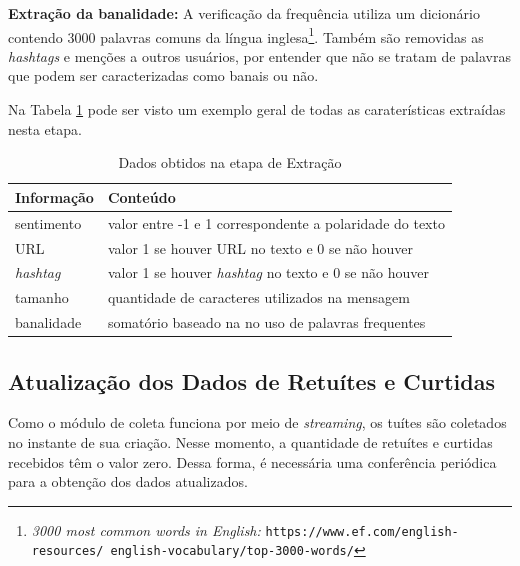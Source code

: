 \documentclass[oneside,openright,12pt]{ufsm_2015} %
\begin{document}
    \par \textbf{Extração da banalidade:} A verificação da frequência utiliza um dicionário contendo 3000 palavras comuns da língua inglesa\footnote{\textit{3000 most common words in English: }\texttt{https://www.ef.com/english-resources/ english-vocabulary/top-3000-words/}}. Também são removidas as \textit{hashtags} e menções a outros usuários, por entender que não se tratam de palavras que podem ser caracterizadas como banais ou não.
    
    \par Na Tabela \ref{tab:dados-extracao} pode ser visto um exemplo geral de todas as caraterísticas extraídas nesta etapa.

    \begin{table}[ht]
    \centering
    \caption{Dados obtidos na etapa de Extração}
    \label{tab:dados-extracao}
    \begin{tabular}{|l|l|}
    \hline
    \textbf{Informação} & \textbf{Conteúdo} \\ \hline
    sentimento & valor entre -1 e 1 correspondente a polaridade do texto \\ \hline
    URL & valor 1 se houver URL no texto e 0 se não houver \\ \hline
    \textit{hashtag} & valor 1 se houver \textit{hashtag} no texto e 0 se não houver \\ \hline
    tamanho & quantidade de caracteres utilizados na mensagem \\ \hline
    banalidade & somatório baseado na no uso de palavras frequentes \\ \hline
    \end{tabular}
    \end{table}



\subsection{Atualização dos Dados de Retuítes e Curtidas}

    \par Como o módulo de coleta funciona por meio de \textit{streaming}, os tuítes são coletados no instante de sua criação. Nesse momento, a quantidade de retuítes e curtidas recebidos têm o valor zero. Dessa forma, é necessária uma conferência periódica para a obtenção dos dados atualizados.
    
\end{document}
